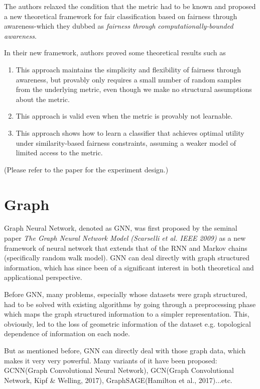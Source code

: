 \documentclass{article}
\begin{document}
The authors relaxed the condition that the metric had to be known and proposed a new theoretical framework for fair classification based on fairness through awareness-which they dubbed as \textit{fairness through computationally-bounded awareness}.

In their new framework, authors proved some theoretical results such as
\begin{enumerate}
\item This approach maintains the simplicity and flexibility of fairness through awareness, but provably only requires a small number of random samples from the underlying metric, even though we make no structural assumptions about the metric.
\item This approach is valid even when the metric is provably not learnable.
\item This approach shows how to learn a classifier that achieves optimal utility under similarity-based fairness constraints, assuming a weaker model of limited access to the metric.
\end{enumerate}

(Please refer to the paper for the experiment design.)

\section{Graph}
\indent
Graph Neural Network, denoted as GNN, was first proposed by the seminal paper \textit{The Graph Neural Network Model (Scarselli et al. IEEE 2009)} as a new framework of neural network that extends that of the RNN and Markov chains (specifically random walk model).
GNN can deal directly with graph structured information, which has since been of a significant interest in both theoretical and applicational perspective.

Before GNN, many problems, especially whose datasets were graph structured, had to be solved with existing algorithms by going through a preprocessing phase which maps the graph structured information to a simpler representation. This, obviously, led to the loss of geometric information of the dataset e.g. topological dependence of information on each node.

But as mentioned before, GNN can directly deal with those graph data, which makes it very very powerful. Many variants of it have been proposed: GCNN(Graph Convolutional Neural Network), GCN(Graph Convolutional Network, Kipf \& Welling, 2017), GraphSAGE(Hamilton et al., 2017)...etc.
\end{document}
